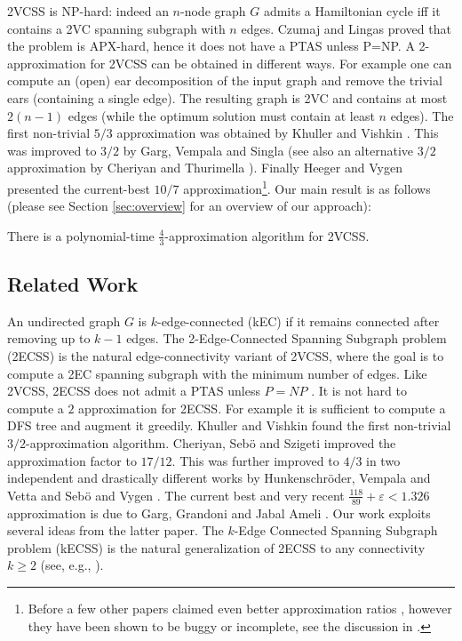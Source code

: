 \documentclass{theoretics}
\newcommand{\eps}{\varepsilon}
\begin{document}
2VCSS is NP-hard: indeed an $n$-node graph $G$ admits a Hamiltonian cycle iff it contains a 2VC spanning subgraph with $n$ edges. Czumaj and Lingas \cite{CL99} proved that the problem is APX-hard, hence it does not have a PTAS unless P=NP. A 2-approximation for 2VCSS can be obtained in different ways. For example one can compute an (open) ear decomposition of the input graph and remove the trivial ears (containing a single edge). The resulting graph is 2VC and contains at most $2(n-1)$ edges (while the optimum solution must contain at least $n$ edges). 
The first non-trivial $5/3$ approximation was obtained by Khuller and Vishkin \cite{KV94}. This was improved to $3/2$ by Garg, Vempala and Singla \cite{GVS93} (see also an alternative $3/2$ approximation by Cheriyan and Thurimella \cite{CT00}). Finally Heeger and Vygen \cite{HV17} presented the current-best $10/7$ approximation\footnote{Before \cite{HV17} a few other papers claimed even better approximation ratios \cite{GR05,JRV03}, however they have been shown to be buggy or incomplete, see the discussion in \cite{HV17}.}. Our main result is as follows (please see Section \ref{sec:overview} for an overview of our approach):   
\begin{theorem}\label{thm:mainTheorem}
There is a polynomial-time $\frac{4}{3}$-approximation algorithm for 2VCSS.    
\end{theorem}

\subsection{Related Work}

An undirected graph $G$ is $k$-edge-connected (kEC) if it remains connected after removing up to $k-1$ edges. The 2-Edge-Connected Spanning Subgraph problem (2ECSS) is the natural edge-connectivity variant of 2VCSS, where the goal is to compute a 2EC spanning subgraph with the minimum number of edges. Like 2VCSS, 2ECSS does not admit a PTAS unless $P=NP$ \cite{CL99}. It is not hard to compute a $2$ approximation for 2ECSS. For example it is sufficient to compute a DFS tree and augment it greedily. Khuller and Vishkin \cite{KV92} found the first non-trivial $3/2$-approximation algorithm. Cheriyan, Seb{\"{o}} and Szigeti \cite{CSS01} improved the approximation factor to $17/12$. This was further improved to $4/3$ in two independent and drastically different works by Hunkenschr{\"o}der, Vempala and Vetta \cite{HVV19} and Seb{\"o} and Vygen \cite{SV14}. The current best and very recent $\frac{118}{89}+\eps<1.326$ approximation is due to Garg, Grandoni and Jabal Ameli \cite{GGJ23}. Our work exploits several ideas from the latter paper. The $k$-Edge Connected Spanning Subgraph problem (kECSS) is the natural generalization of 2ECSS to any connectivity $k\geq 2$ (see, e.g., \cite{CT00,GG12}).
\end{document}
